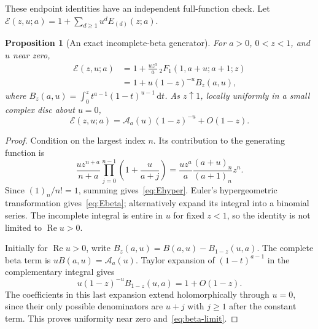 \documentclass[11pt,oneside]{article}
\numberwithin{equation}{section}
\newtheorem{proposition}[theorem]{Proposition}
\theoremstyle{definition}
\theoremstyle{remark}
\DeclareMathOperator{\Rea}{Re}
\newcommand{\dd}{\,\mathrm d}
\newcommand{\Acal}{\mathcal A}
\begin{document}
These endpoint identities have an independent full-function check. Let
$\mathcal E(z,u;a)=1+\sum_{d\ge1}u^dE_{(d)}(z;a)$.

\begin{proposition}[An exact incomplete-beta generator]\label{prop:beta}
For $a>0$, $0<z<1$, and $u$ near zero,
\begin{align}
\mathcal E(z,u;a)
 &=1+\frac{u z^a}{a}\,{}_2F_1(1,a+u;a+1;z)\label{eq:Ehyper}\\
 &=1+u(1-z)^{-u}B_z(a,u),\label{eq:Ebeta}
\end{align}
where $B_z(a,u)=\int_0^z t^{a-1}(1-t)^{u-1}\dd t$.
As $z\uparrow1$, locally uniformly in a small complex disc about $u=0$,
\begin{equation}\label{eq:beta-limit}
\mathcal E(z,u;a)=\Acal_a(u)(1-z)^{-u}+O(1-z).
\end{equation}
\end{proposition}

\begin{proof}
Condition on the largest index $n$. Its contribution to the generating
function is
\[
\frac{u z^{n+a}}{n+a}
 \prod_{j=0}^{n-1}\left(1+\frac{u}{a+j}\right)
=\frac{u z^a}{a}\frac{(a+u)_n}{(a+1)_n}z^n.
\]
Since $(1)_n/n!=1$, summing gives~\eqref{eq:Ehyper}. Euler's
hypergeometric transformation gives~\eqref{eq:Ebeta}; alternatively expand
its integral into a binomial series. The incomplete integral is entire in
$u$ for fixed $z<1$, so the identity is not limited to $\Rea u>0$.

Initially for $\Rea u>0$, write
$B_z(a,u)=B(a,u)-B_{1-z}(u,a)$. The complete beta term is
$uB(a,u)=\Acal_a(u)$. Taylor expansion of $(1-t)^{a-1}$ in the complementary
integral gives
\[
u(1-z)^{-u}B_{1-z}(u,a)=1+O(1-z).
\]
The coefficients in this last expansion extend holomorphically through
$u=0$, since their only possible denominators are $u+j$ with $j\ge1$ after
the constant term. This proves uniformity near zero and~\eqref{eq:beta-limit}.
\end{proof}
\end{document}

